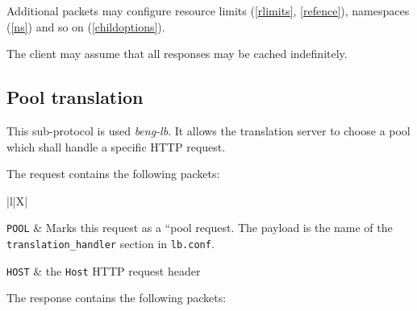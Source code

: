 \documentclass[a4paper,12pt]{article}
\begin{document}
Additional packets may configure resource limits (\ref{rlimits},
\ref{refence}), namespaces (\ref{ns}) and so on (\ref{childoptions}).

The client may assume that all responses may be cached indefinitely.


\subsection{Pool translation}
\label{pooltrans}

This sub-protocol is used \emph{beng-lb}.  It allows the translation
server to choose a pool which shall handle a specific HTTP request.

The request contains the following packets:

\begin{longtabu*}{|l|X|}
\hline

\verb|POOL| & Marks this request as a ``pool request.  The payload is
the name of the \verb|translation_handler| section in
\texttt{lb.conf}. \\

\hline

\verb|HOST| & the \texttt{Host} HTTP request header \\

\hline
\end{longtabu*}

The response contains the following packets:
\end{document}
